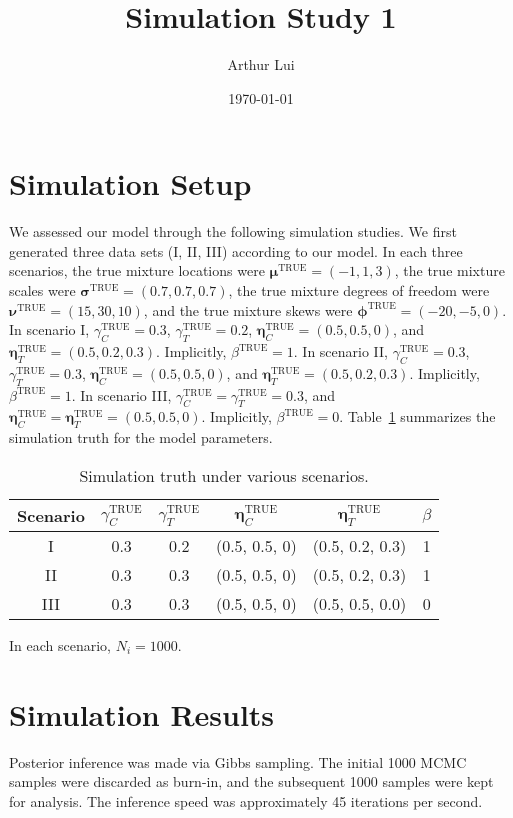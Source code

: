 \documentclass[12pt]{article} %
\title{Simulation Study 1}
\author{Arthur Lui}
\date{\today} %
\newcommand{\true}{\text{TRUE}}
\begin{document}
\maketitle

\section{Simulation Setup}\label{sec:sim-setup}
We assessed our model through the following simulation studies. We first
generated three data sets (I, II, III) according to our model. In each three
scenarios, 
%
the true mixture locations were $\bm{\mu}^\true=(-1, 1, 3)$,
the true mixture scales were $\bm{\sigma}^\true=(0.7, 0.7, 0.7)$,
the true mixture degrees of freedom were $\bm{\nu}^\true=(15, 30, 10)$, and
the true mixture skews were $\bm{\phi}^\true=(-20, -5, 0)$.
%
In scenario I, $\gamma_C^\true=0.3$, $\gamma_T^\true=0.2$, $\bm\eta_C^\true=(0.5,
0.5, 0)$, and $\bm\eta_T^\true=(0.5,0.2,0.3)$. Implicitly, $\beta^\true=1$.
In scenario II, $\gamma_C^\true=0.3$, $\gamma_T^\true=0.3$, $\bm\eta_C^\true=(0.5,
0.5, 0)$, and $\bm\eta_T^\true=(0.5,0.2,0.3)$. Implicitly, $\beta^\true=1$.
In scenario III, $\gamma_C^\true=\gamma_T^\true=0.3$, and
$\bm\eta_C^\true=\bm\eta_T^\true=(0.5, 0.5, 0)$. Implicitly, $\beta^\true=0$.
%
Table~\ref{tab:sim-truth} summarizes the simulation truth for the model parameters.
\begin{table}
  \centering
  \begin{tabular}{|c|ccccc|}
    \hline 
    Scenario & $\gamma_C^\true$ & $\gamma_T^\true$ & $\bm\eta_C^\true$ & 
    $\bm\eta_T^\true$ & $\beta$ \\
    \hline 
    I   & 0.3 & 0.2 & (0.5, 0.5, 0) & (0.5, 0.2, 0.3) & 1 \\
    II  & 0.3 & 0.3 & (0.5, 0.5, 0) & (0.5, 0.2, 0.3) & 1 \\
    III & 0.3 & 0.3 & (0.5, 0.5, 0) & (0.5, 0.5, 0.0) & 0 \\
    \hline
  \end{tabular}
  \caption{Simulation truth under various scenarios.}
  \label{tab:sim-truth}
\end{table}
In each scenario, $N_i=1000$.

\section{Simulation Results}\label{sec:sim-results}
Posterior inference was made via Gibbs sampling. The initial 1000 MCMC samples were discarded
as burn-in, and the subsequent 1000 samples were kept for analysis. The inference speed was
approximately 45 iterations per second.
\end{document}
